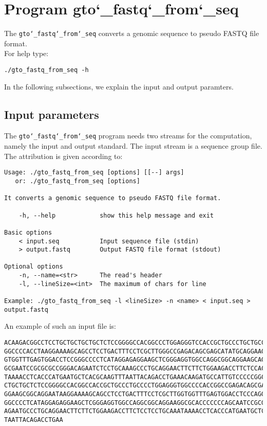 \section{Program gto\char`_fastq\char`_from\char`_seq}
The \texttt{gto\char`_fastq\char`_from\char`_seq} converts a genomic sequence to pseudo FASTQ file format.\\
For help type:
\begin{lstlisting}
./gto_fastq_from_seq -h
\end{lstlisting}
In the following subsections, we explain the input and output paramters.

\subsection*{Input parameters}

The \texttt{gto\char`_fastq\char`_from\char`_seq} program needs two streams for the computation, namely the input and output standard. The input stream is a sequence group file.\\
The attribution is given according to:
\begin{lstlisting}
Usage: ./gto_fastq_from_seq [options] [[--] args]
   or: ./gto_fastq_from_seq [options]

It converts a genomic sequence to pseudo FASTQ file format.

    -h, --help            show this help message and exit

Basic options
    < input.seq           Input sequence file (stdin)
    > output.fastq        Output FASTQ file format (stdout)

Optional options
    -n, --name=<str>      The read's header
    -l, --lineSize=<int>  The maximum of chars for line

Example: ./gto_fastq_from_seq -l <lineSize> -n <name> < input.seq > output.fastq
\end{lstlisting}
An example of such an input file is:
\begin{lstlisting}
ACAAGACGGCCTCCTGCTGCTGCTGCTCTCCGGGGCCACGGCCCTGGAGGGTCCACCGCTGCCCTGCTGCCATTGTCCCC
GGCCCCACCTAAGGAAAAGCAGCCTCCTGACTTTCCTCGCTTGGGCCGAGACAGCGAGCATATGCAGGAAGCGGCAGGAA
GTGGTTTGAGTGGACCTCCGGGCCCCTCATAGGAGAGGAAGCTCGGGAGGTGGCCAGGCGGCAGGAAGCAGGCCAGTGCC
GCGAATCCGCGCGCCGGGACAGAATCTCCTGCAAAGCCCTGCAGGAACTTCTTCTGGAAGACCTTCTCCACCCCCCCAGC
TAAAACCTCACCCATGAATGCTCACGCAAGTTTAATTACAGACCTGAAACAAGATGCCATTGTCCCCCGGCCTCCTGCTG
CTGCTGCTCTCCGGGGCCACGGCCACCGCTGCCCTGCCCCTGGAGGGTGGCCCCACCGGCCGAGACAGCGAGCATATGCA
GGAAGCGGCAGGAATAAGGAAAAGCAGCCTCCTGACTTTCCTCGCTTGGTGGTTTGAGTGGACCTCCCAGGCCAGTGCCG
GGCCCCTCATAGGAGAGGAAGCTCGGGAGGTGGCCAGGCGGCAGGAAGGCGCACCCCCCCAGCAATCCGCGCGCCGGGAC
AGAATGCCCTGCAGGAACTTCTTCTGGAAGACCTTCTCCTCCTGCAAATAAAACCTCACCCATGAATGCTCACGCAAGTT
TAATTACAGACCTGAA
\end{lstlisting}


